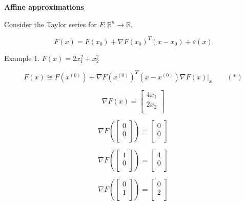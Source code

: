 \textbf{Affine approximations}

Consider the Taylor series for $F\colon \mathbb{R}^n \to \mathbb{R}$.

$$F(x) = F(x_0) + \nabla F(x_0)^{T} (x - x_0) + \varepsilon (x) $$


Example 1. $F(x) = 2 x_1^2 + x_2^2$

$$F(x) \cong F(x^{(0)}) + \nabla F(x^{(0)})^{T} (x - x^{(0)})
\left. \nabla F(x) \right|_{x} \qquad (*)$$

$$\nabla F(x) = \begin{bmatrix} 4x_1\\ 2x_2\\ \end{bmatrix}$$

\begin{displaymath}
\nabla F \left( \begin{bmatrix} 0\\ 0\\ \end{bmatrix} \right)  =
\begin{bmatrix} 0\\ 0\\ \end{bmatrix}
\end{displaymath}

\begin{displaymath}
\nabla F \left( \begin{bmatrix} 1\\ 0\\ \end{bmatrix} \right)  =
\begin{bmatrix} 4\\ 0\\ \end{bmatrix}
\end{displaymath}

\begin{displaymath}
\nabla F \left( \begin{bmatrix} 0\\ 1\\ \end{bmatrix} \right)  =
\begin{bmatrix} 0\\ 2\\ \end{bmatrix}
\end{displaymath}


